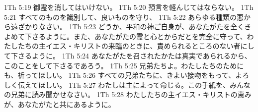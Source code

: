1Th 5:19  御霊を消してはいけない。
1Th 5:20  預言を軽んじてはならない。
1Th 5:21  すべてのものを識別して、良いものを守り、
1Th 5:22  あらゆる種類の悪から遠ざかりなさい。
1Th 5:23  どうか、平和の神ご自身が、あなたがたを全くきよめて下さるように。また、あなたがたの霊と心とからだとを完全に守って、わたしたちの主イエス・キリストの来臨のときに、責められるところのない者にして下さるように。
1Th 5:24  あなたがたを召されたかたは真実であられるから、このことをして下さるであろう。
1Th 5:25  兄弟たちよ。わたしたちのためにも、祈ってほしい。
1Th 5:26  すべての兄弟たちに、きよい接吻をもって、よろしく伝えてほしい。
1Th 5:27  わたしは主によって命じる。この手紙を、みんなの兄弟に読み聞かせなさい。
1Th 5:28  わたしたちの主イエス・キリストの恵みが、あなたがたと共にあるように。


